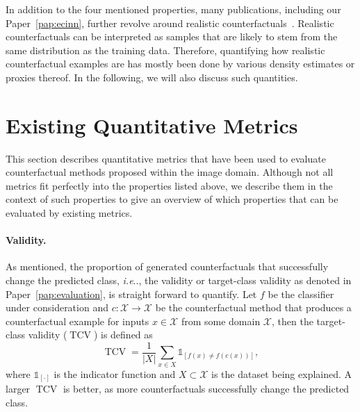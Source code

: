 \documentclass[11pt,a4paper,twoside,openright,final]{memoir}
\makeatletter
\DeclareRobustCommand\onedot{\futurelet\@let@token\@onedot}
\def\@onedot{\ifx\@let@token.\else.\null\fi\xspace}
\def\ie{\emph{i.e}\onedot} \def\Ie{\emph{I.e}\onedot}
\newcommand*{\paperref}[1]{Paper~\hyperref[#1]{\ref{#1}}}
\makeatother
\begin{document}
In addition to the four mentioned properties, many publications, including our \paperref{pap:ecinn}, further revolve around realistic counterfactuals~\cite{Singla2019, flowcounterfactuals, Rodriguez2021, VanLooveren2019}.
Realistic counterfactuals can be interpreted as samples that are likely to stem from the same distribution as the training data. 
Therefore, quantifying how realistic counterfactual examples are has mostly been done by various density estimates or proxies thereof.
In the following, we will also discuss such quantities. 

\section{Existing Quantitative Metrics}\label{sec:existing-metrics}

This section describes quantitative metrics that have been used to evaluate counterfactual methods proposed within the image domain.
Although not all metrics fit perfectly into the properties listed above, we describe them in the context of such properties to give an overview of which properties that can be evaluated by existing metrics.

\paragraph{Validity.}
As mentioned, the proportion of generated counterfactuals that successfully change the predicted class, \ie, the validity or target-class validity as denoted in \paperref{pap:evaluation}, is straight forward to quantify.
Let $f$ be the classifier under consideration and $c: \mathcal{X} \rightarrow \mathcal{X}$ be the counterfactual method that produces a counterfactual example for inputs $x\in \mathcal{X}$ from some domain $\mathcal{X}$, then the target-class validity ($\operatorname{TCV}$) is defined as
\begin{equation}\label{eq:tcv}
    \operatorname{TCV} = \frac{1}{|X|} \sum_{x \in X} \mathbb{1}_{[ f(x) \neq f( c(x) )]}, 
\end{equation}
where $\mathbb{1}_{[\cdot]}$ is the indicator function and $X \subset \mathcal{X}$ is the dataset being explained.
A larger $\operatorname{TCV}$ is better, as more counterfactuals successfully change the predicted class.
\end{document}
